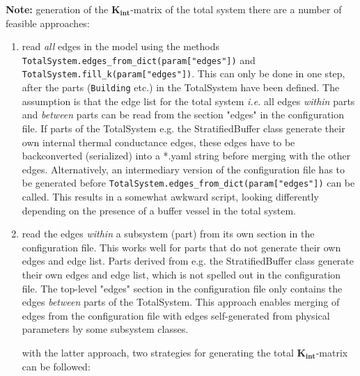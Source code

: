 \begin{footnotesize}
	
\textbf{Note:} generation of the $\mathbf{K_{int}}$-matrix of the total system there are a number of feasible approaches:

\begin{enumerate}
	\item  read \emph{all} edges in the model using the methods \texttt{TotalSystem.edges\_from\_dict(param["edges"])} and \\ \texttt{TotalSystem.fill\_k(param["edges"])}.
	This can only be done in one step, after the parts (\texttt{Building} etc.) in the TotalSystem have been defined. The assumption is that the edge list for the total system \textit{i.e.} all edges \emph{within} parts and \emph{between} parts can be read from the section "edges" in the configuration file. If parts of the TotalSystem e.g. the StratifiedBuffer class generate their own internal thermal conductance edges, these edges have to be backconverted (serialized) into a *.yaml string before merging with the other edges. Alternatively, an intermediary version of the configuration file has to be generated before \texttt{TotalSystem.edges\_from\_dict(param["edges"])} can be called. This results in a somewhat awkward script, looking differently depending on the presence of a buffer vessel in the total system.
	
	\item read the edges \emph{within} a subsystem (part) from its own section in the configuration file. This works well for parts that do not generate their own edges and edge list. Parts derived from e.g. the StratifiedBuffer class generate their own edges and edge list, which is not spelled out in the configuration file. The top-level "edges" section in the configuration file only contains the edges \emph{between} parts of the TotalSystem. This approach enables merging of edges from the configuration file with edges self-generated from physical parameters by some subsystem classes.
	
	with the latter approach, two strategies for generating the total $\mathbf{K_{int}}$-matrix can be followed:


\end{enumerate}
\end{footnotesize}
